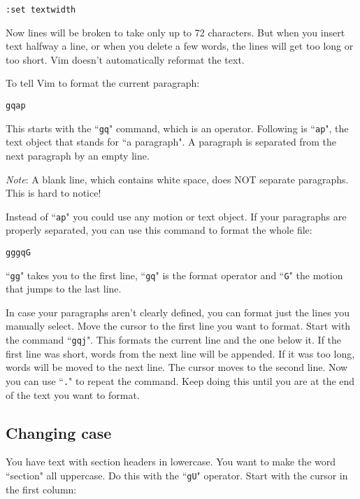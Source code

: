 \begin{Verbatim}[samepage=true]
 :set textwidth
\end{Verbatim}

Now lines will be broken to take only up to 72 characters.
But when you insert text halfway a line, or when you delete a few words, the lines will get too long or too short.
Vim doesn't automatically reformat the text.

To tell Vim to format the current paragraph:

\begin{Verbatim}[samepage=true]
 gqap
\end{Verbatim}

This starts with the ``\texttt{gq}" command, which is an operator.
Following is ``\texttt{ap}", the text object that stands for ``a paragraph".
A paragraph is separated from the next paragraph by an empty line.

\emph{Note}:
A blank line, which contains white space, does NOT separate paragraphs.
This is hard to notice!

Instead of ``\texttt{ap}" you could use any motion or text object.
If your paragraphs are properly separated, you can use this command to format the whole file:

\begin{Verbatim}[samepage=true]
 gggqG
\end{Verbatim}

``\texttt{gg}" takes you to the first line, ``\texttt{gq}" is the format operator and ``\texttt{G}" the motion that jumps to the last line.

In case your paragraphs aren't clearly defined, you can format just the lines you manually select.
Move the cursor to the first line you want to format.
Start with the command ``\texttt{gqj}".
This formats the current line and the one below it.
If the first line was short, words from the next line will be appended.
If it was too long, words will be moved to the next line.
The cursor moves to the second line.
Now you can use ``\texttt{.}" to repeat the command.
Keep doing this until you are at the end of the text you want to format.

\subsection{Changing case}
You have text with section headers in lowercase.
You want to make the word ``section" all uppercase.
Do this with the ``\texttt{gU}" operator.
Start with the cursor in the first column:

